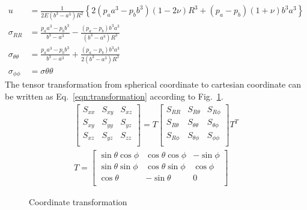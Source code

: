 \begin{subequations}
\begin{align}
  u & = \frac{1}{2E(b^3-a^3)R^2}\left\{ 2(p_aa^3-p_bb^3)(1-2\nu)R^3+(p_a-p_b)(1+\nu)b^3a^3\right\}\\
  \sigma_{RR} & = \frac{p_aa^3-p_bb^3}{b^3-a^3} - \frac{(p_a-p_b)b^3a^3}{(b^3-a^3)R^3}\\
  \sigma_{\theta\theta} & = \frac{p_aa^3-p_bb^3}{b^3-a^3} + \frac{(p_a-p_b)b^3a^3}{2(b^3-a^3)R^3}\\
  \sigma_{\phi\phi} & = \sigma{\theta\theta}
  \label{oct_eq:ex_hollow_sphere_ana_sol}
\end{align}
\end{subequations}
The tensor transformation from spherical coordinate to cartesian coordinate can be written as Eq.~\ref{eqn:transformation} according to Fig.~\ref{octree_fig:oct_ex_hollow_sphere_tran}.
\begin{subequations}
  \begin{align}
    \begin{bmatrix}
      S_{xx} & S_{xy} & S_{xz} \\
      S_{xy} & S_{yy} & S_{yz} \\
      S_{xz} & S_{yz} & S_{zz} \\
    \end{bmatrix} = T\begin{bmatrix}
      S_{RR} & S_{R\theta} & S_{R\phi} \\
      S_{R\theta} & S_{\theta\theta} & S_{\theta\phi}\\
      S_{R\phi} & S_{\theta\phi} & S_{\phi\phi} \\
    \end{bmatrix} T^T\\
  T = 
\begin{bmatrix}
\sin\theta\cos\phi & \cos\theta\cos\phi & -\sin\phi \\
\sin\theta\sin\phi & \cos\theta\sin\phi & \cos\phi  \\
\cos\theta & -\sin\theta & 0 \\
\end{bmatrix}
\end{align}
\label{eqn:transformation}
\end{subequations}
%
\begin{figure}[h!]
    \centering
    \caption{Coordinate transformation}
    \label{octree_fig:oct_ex_hollow_sphere_tran}
  \end{figure}
